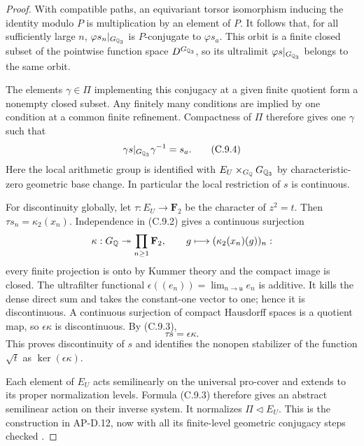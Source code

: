 \begin{proof}
With compatible paths, an equivariant torsor isomorphism inducing
the identity modulo $P$ is multiplication by an element of $P$.
It follows that, for all sufficiently large $n$,
$\varphi s_n|_{G_{\mathbb Q_3}}$ is $P$-conjugate to
$\varphi s_a$. This orbit is a finite closed subset of the
pointwise function space $D^{G_{\mathbb Q_3}}$, so its ultralimit
$\varphi s|_{G_{\mathbb Q_3}}$ belongs to the same orbit.

The elements $\gamma\in\Pi$ implementing this conjugacy at a
given finite quotient form a nonempty closed subset. Any finitely
many conditions are implied by one condition at a common finite
refinement. Compactness of $\Pi$ therefore gives one $\gamma$
such that
\[
 \gamma s|_{G_{\mathbb Q_3}}\gamma^{-1}=s_a.
 \tag{C.9.4}
\]
Here the local arithmetic group is identified with
$E_U\times_{G_\mathbb Q}G_{\mathbb Q_3}$ by characteristic-zero geometric
base change. In particular the local restriction of $s$ is continuous.

For discontinuity globally, let $\tau:E_U\to\mathbf F_2$
be the character of $z^2=t$. Then
$\tau s_n=\kappa_2(x_n)$. Independence in (C.9.2) gives a
continuous surjection
\[
 \kappa:G_\mathbb Q\twoheadrightarrow\prod_{n\ge1}\mathbf F_2,
 \qquad g\longmapsto(\kappa_2(x_n)(g))_n:
\]
every finite projection is onto by Kummer theory and the compact
image is closed. The ultrafilter functional
$\epsilon((e_n))=\lim_{n\to\mathfrak u}e_n$ is additive.
It kills the dense direct sum and takes the constant-one vector
to one; hence it is discontinuous. A continuous surjection of
compact Hausdorff spaces is a quotient map, so
$\epsilon\kappa$ is discontinuous. By (C.9.3),
\[
 \tau s=\epsilon\kappa.
\]
This proves discontinuity of $s$ and identifies the nonopen
stabilizer of the function $\sqrt t$ as $\ker(\epsilon\kappa)$.

Each element of $E_U$ acts semilinearly on the universal pro-cover
and extends to its proper normalization levels. Formula (C.9.3)
therefore gives an abstract semilinear action on their inverse
system. It normalizes $\Pi\triangleleft E_U$. This is the
construction in AP-D.12, now with all its finite-level geometric
conjugacy steps checked \cite[D.12]{AgentAP}.
\end{proof}

